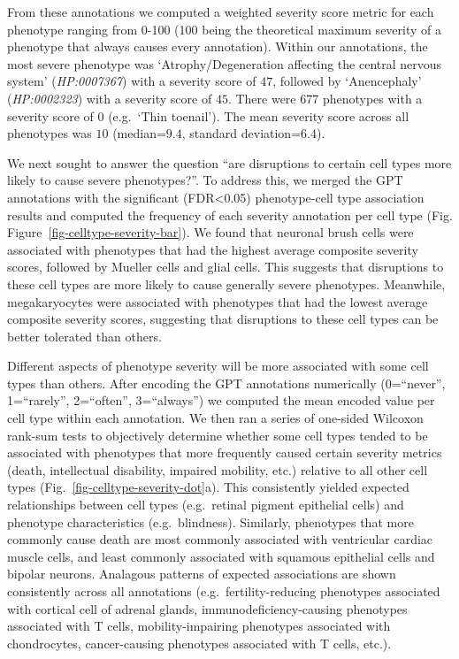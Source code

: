 \documentclass[
]{article}
\begin{document}
From these annotations we computed a weighted severity score metric for
each phenotype ranging from 0-100 (100 being the theoretical maximum
severity of a phenotype that always causes every annotation). Within our
annotations, the most severe phenotype was `Atrophy/Degeneration
affecting the central nervous system' (\emph{HP:0007367}) with a
severity score of \(47\), followed by `Anencephaly' (\emph{HP:0002323})
with a severity score of \(45\). There were 677 phenotypes with a
severity score of 0 (e.g.~`Thin toenail'). The mean severity score
across all phenotypes was \(10\) (median=\(9.4\), standard
deviation=\(6.4\)).

We next sought to answer the question ``are disruptions to certain cell
types more likely to cause severe phenotypes?''. To address this, we
merged the GPT annotations with the significant (FDR\textless0.05)
phenotype-cell type association results and computed the frequency of
each severity annotation per cell type (Fig.
Figure~\ref{fig-celltype-severity-bar}). We found that neuronal brush
cells were associated with phenotypes that had the highest average
composite severity scores, followed by Mueller cells and glial cells.
This suggests that disruptions to these cell types are more likely to
cause generally severe phenotypes. Meanwhile, megakaryocytes were
associated with phenotypes that had the lowest average composite
severity scores, suggesting that disruptions to these cell types can be
better tolerated than others.

Different aspects of phenotype severity will be more associated with
some cell types than others. After encoding the GPT annotations
numerically (0=``never'', 1=``rarely'', 2=``often'', 3=``always'') we
computed the mean encoded value per cell type within each annotation. We
then ran a series of one-sided Wilcoxon rank-sum tests to objectively
determine whether some cell types tended to be associated with
phenotypes that more frequently caused certain severity metrics (death,
intellectual disability, impaired mobility, etc.) relative to all other
cell types (Fig.~\ref{fig-celltype-severity-dot}a). This consistently
yielded expected relationships between cell types (e.g.~retinal pigment
epithelial cells) and phenotype characteristics (e.g.~blindness).
Similarly, phenotypes that more commonly cause death are most commonly
associated with ventricular cardiac muscle cells, and least commonly
associated with squamous epithelial cells and bipolar neurons. Analagous
patterns of expected associations are shown consistently across all
annotations (e.g.~fertility-reducing phenotypes associated with cortical
cell of adrenal glands, immunodeficiency-causing phenotypes associated
with T cells, mobility-impairing phenotypes associated with
chondrocytes, cancer-causing phenotypes associated with T cells, etc.).
\end{document}
